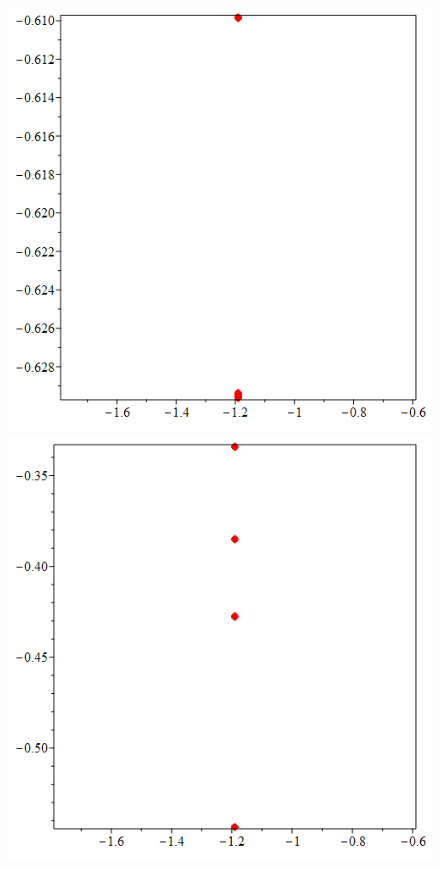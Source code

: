 \documentclass[10pt,a4paper]{article}
\begin{document}
	\begin{figure}[h]
		\centering
		{\includegraphics[scale=0.2]{poincare f=0.1}}
		{\includegraphics[scale=0.2]{poincare f=0.65}}

\end{figure}
\end{document}
